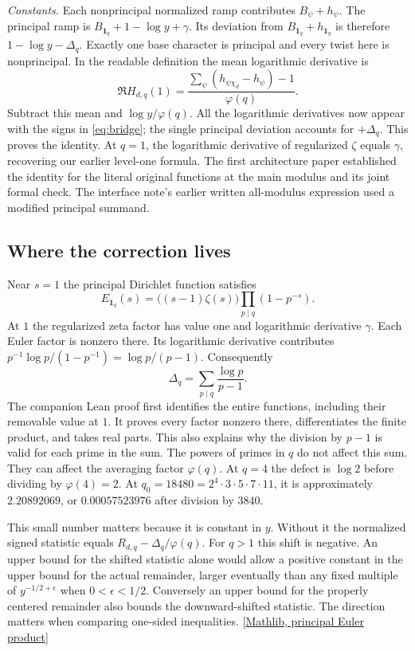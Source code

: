 \documentclass[12pt,letterpaper]{article}
\begin{document}
\emph{Constants.} Each nonprincipal normalized ramp contributes $B_\psi+h_\psi$. The principal ramp is $B_{\mathbf1_q}+1-\log y+\gamma$. Its deviation from $B_{\mathbf1_q}+h_{\mathbf1_q}$ is therefore $1-\log y-\Delta_q$. Exactly one base character is principal and every twist here is nonprincipal. In the readable definition the mean logarithmic derivative is
\[
 \Re H_{d,q}(1)=\frac{\sum_\psi(h_{\psi\chi_d}-h_\psi)-1}{\varphi(q)} .
\]
Subtract this mean and $\log y/\varphi(q)$. All the logarithmic derivatives now appear with the signs in \eqref{eq:bridge}; the single principal deviation accounts for $+\Delta_q$. This proves the identity. At $q=1$, the logarithmic derivative of regularized $\zeta$ equals $\gamma$, recovering our earlier level-one formula. The first architecture paper established the identity for the literal original functions at the main modulus and its joint formal check. The interface note’s earlier written all-modulus expression used a modified principal summand.

\subsection{Where the correction lives}
Near $s=1$ the principal Dirichlet function satisfies
\[
 E_{\mathbf1_q}(s)=\big((s-1)\zeta(s)\big)
          \prod_{p\mid q}(1-p^{-s}).
\]
At $1$ the regularized zeta factor has value one and logarithmic derivative $\gamma$. Each Euler factor is nonzero there. Its logarithmic derivative contributes $p^{-1}\log p/(1-p^{-1})=\log p/(p-1)$. Consequently
\[
 \Delta_q=\sum_{p\mid q}\frac{\log p}{p-1}.
\]
The companion Lean proof first identifies the entire functions, including their removable value at $1$. It proves every factor nonzero there, differentiates the finite product, and takes real parts. This also explains why the division by $p-1$ is valid for each prime in the sum. The powers of primes in $q$ do not affect this sum. They can affect the averaging factor $\varphi(q)$. At $q=4$ the defect is $\log 2$ before dividing by $\varphi(4)=2$. At $q_0=18480=2^4\cdot3\cdot5\cdot7\cdot11$, it is approximately $2.20892069$, or $0.00057523976$ after division by $3840$.

This small number matters because it is constant in $y$. Without it the normalized signed statistic equals $R_{d,q}-\Delta_q/\varphi(q)$. For $q>1$ this shift is negative. An upper bound for the shifted statistic alone would allow a positive constant in the upper bound for the actual remainder, larger eventually than any fixed multiple of $y^{-1/2+\epsilon}$ when $0<\epsilon<1/2$. Conversely an upper bound for the properly centered remainder also bounds the downward-shifted statistic. The direction matters when comparing one-sided inequalities. {\small\sffamily\color{mute}[\href{https://github.com/leanprover-community/mathlib4/blob/56a005855ea17e0b0958f73ec801ae140b0a1679/Mathlib/NumberTheory/LSeries/DirichletContinuation.lean#L173}{Mathlib, principal Euler product}]}
\end{document}
